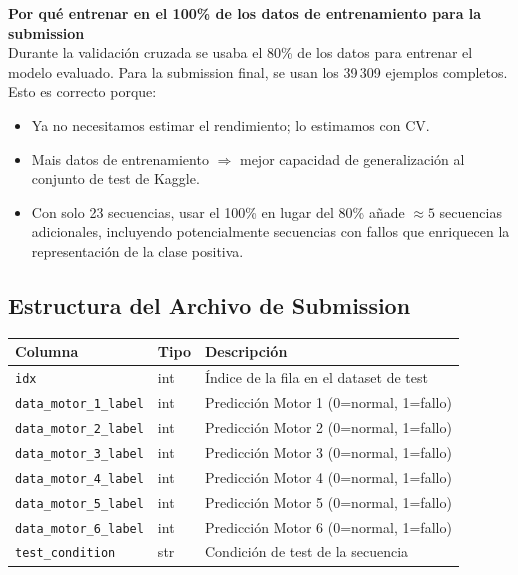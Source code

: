 \documentclass[12pt,a4paper]{article}
\begin{document}
\begin{advertenciabox}
\textbf{Por qu\'{e} entrenar en el 100\% de los datos de entrenamiento para la submission}\\[4pt]
Durante la validaci\'{o}n cruzada se usaba el 80\% de los datos para entrenar el modelo
evaluado. Para la submission final, se usan los 39\,309 ejemplos completos. Esto es
correcto porque:
\begin{itemize}[itemsep=2pt]
  \item Ya no necesitamos estimar el rendimiento; lo estimamos con CV.
  \item Mais datos de entrenamiento $\Rightarrow$ mejor capacidad de generalizaci\'{o}n
    al conjunto de test de Kaggle.
  \item Con solo 23 secuencias, usar el 100\% en lugar del 80\% añade $\approx 5$
    secuencias adicionales, incluyendo potencialmente secuencias con fallos que
    enriquecen la representaci\'{o}n de la clase positiva.
\end{itemize}
\end{advertenciabox}

\subsection{Estructura del Archivo de Submission}

\begin{center}
\begin{tabular}{llp{5.5cm}}
\toprule
\textbf{Columna} & \textbf{Tipo} & \textbf{Descripci\'{o}n} \\
\midrule
\texttt{idx}                     & int   & \'{I}ndice de la fila en el dataset de test \\
\texttt{data\_motor\_1\_label}   & int   & Predicci\'{o}n Motor 1 (0=normal, 1=fallo) \\
\texttt{data\_motor\_2\_label}   & int   & Predicci\'{o}n Motor 2 (0=normal, 1=fallo) \\
\texttt{data\_motor\_3\_label}   & int   & Predicci\'{o}n Motor 3 (0=normal, 1=fallo) \\
\texttt{data\_motor\_4\_label}   & int   & Predicci\'{o}n Motor 4 (0=normal, 1=fallo) \\
\texttt{data\_motor\_5\_label}   & int   & Predicci\'{o}n Motor 5 (0=normal, 1=fallo) \\
\texttt{data\_motor\_6\_label}   & int   & Predicci\'{o}n Motor 6 (0=normal, 1=fallo) \\
\texttt{test\_condition}         & str   & Condici\'{o}n de test de la secuencia \\
\bottomrule
\end{tabular}
\end{center}
\end{document}
